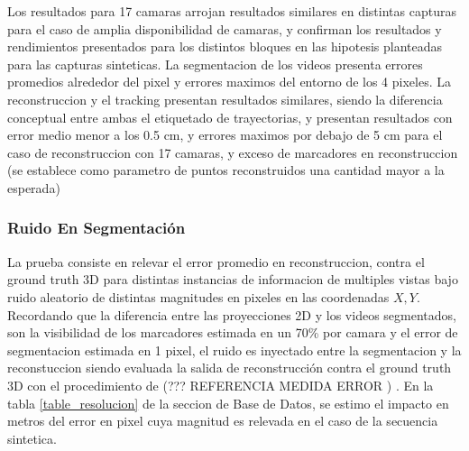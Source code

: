 Los resultados para 17 camaras arrojan resultados similares en distintas capturas para el caso de amplia disponibilidad de camaras, y confirman los resultados y rendimientos presentados para los distintos bloques en las hipotesis planteadas para las capturas sinteticas. La segmentacion de los videos presenta errores promedios alrededor del pixel y errores maximos del entorno de los 4 pixeles. La reconstruccion y el tracking presentan resultados similares, siendo la diferencia conceptual entre ambas el etiquetado de trayectorias, y presentan resultados con error medio menor a los 0.5 cm, y errores maximos por debajo de 5 cm para el caso de reconstruccion con 17 camaras, y exceso de marcadores en reconstruccion (se establece como parametro de puntos reconstruidos una cantidad mayor a la esperada) 

\subsubsection{Ruido En Segmentación}

La prueba consiste en relevar el error promedio en reconstruccion, contra el ground truth 3D para distintas instancias de informacion de multiples vistas bajo ruido aleatorio de distintas magnitudes en pixeles en las coordenadas $X,Y$. Recordando que la diferencia entre las proyecciones 2D y los videos segmentados, son la visibilidad de los marcadores estimada en un 70\% por camara y el error de segmentacion estimada en 1 pixel, el ruido es inyectado entre la segmentacion y la reconstuccion siendo evaluada la salida de reconstrucción contra el ground truth 3D con el procedimiento de (??? REFERENCIA MEDIDA ERROR ) . En la tabla \ref{table_resolucion} de la seccion de Base de Datos, se estimo el impacto en metros del error en pixel cuya magnitud es relevada en el caso de la secuencia sintetica.

